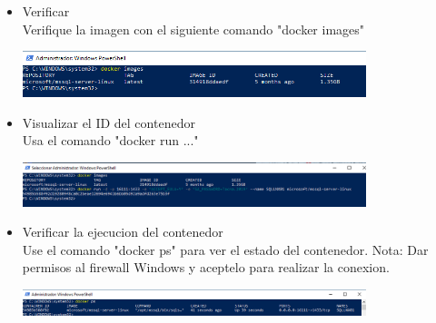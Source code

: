 \begin{itemize}
	\item Verificar
	\\Verifique la imagen con el siguiente comando "docker images"

	\begin{center}
	\includegraphics[width=10cm]{./Imagenes/7} 
	\end{center}

\end{itemize} 

\begin{itemize}
	\item Visualizar el ID del contenedor
	\\Usa el comando "docker run ..."

	\begin{center}
	\includegraphics[width=10cm]{./Imagenes/8} 
	\end{center}

\end{itemize} 

\begin{itemize}
	\item Verificar la ejecucion del contenedor
	\\Use el comando "docker ps" para ver el estado del contenedor. Nota: Dar permisos al firewall Windows y aceptelo para realizar la conexion.

	\begin{center}
	\includegraphics[width=10cm]{./Imagenes/9} 
	\end{center}

\end{itemize} 

